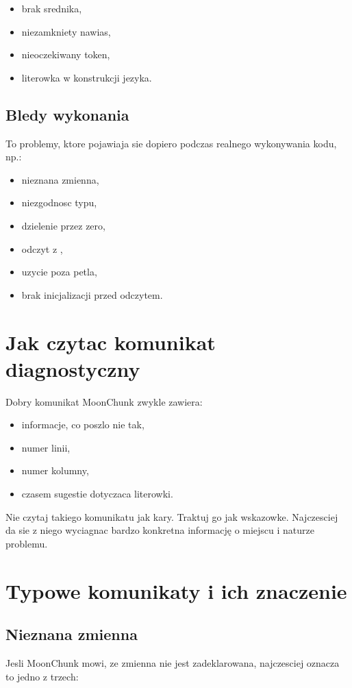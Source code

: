 \begin{itemize}
  \item brak srednika,
  \item niezamkniety nawias,
  \item nieoczekiwany token,
  \item literowka w konstrukcji jezyka.
\end{itemize}

\subsection*{Bledy wykonania}
To problemy, ktore pojawiaja sie dopiero podczas realnego wykonywania kodu, np.:

\begin{itemize}
  \item nieznana zmienna,
  \item niezgodnosc typu,
  \item dzielenie przez zero,
  \item odczyt z ,
  \item uzycie  poza petla,
  \item brak inicjalizacji  przed odczytem.
\end{itemize}

\section{Jak czytac komunikat diagnostyczny}
Dobry komunikat MoonChunk zwykle zawiera:

\begin{itemize}
  \item informacje, co poszlo nie tak,
  \item numer linii,
  \item numer kolumny,
  \item czasem sugestie dotyczaca literowki.
\end{itemize}

Nie czytaj takiego komunikatu jak kary. Traktuj go jak wskazowke. Najczesciej da sie
z niego wyciagnac bardzo konkretna informację o miejscu i naturze problemu.

\section{Typowe komunikaty i ich znaczenie}
\subsection*{Nieznana zmienna}
Jesli MoonChunk mowi, ze zmienna nie jest zadeklarowana, najczesciej oznacza to jedno
z trzech:

